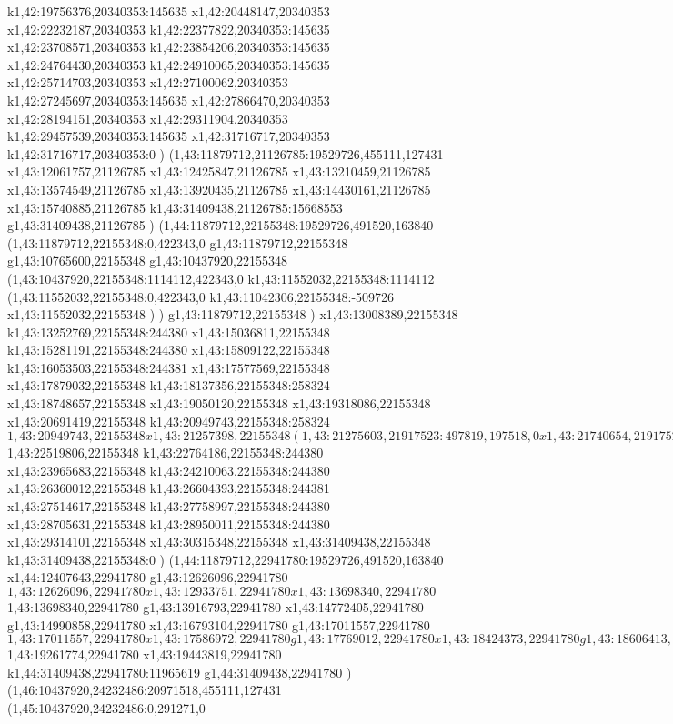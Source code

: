 {k1,42:19756376,20340353:145635
x1,42:20448147,20340353
x1,42:22232187,20340353
k1,42:22377822,20340353:145635
x1,42:23708571,20340353
k1,42:23854206,20340353:145635
x1,42:24764430,20340353
k1,42:24910065,20340353:145635
x1,42:25714703,20340353
x1,42:27100062,20340353
k1,42:27245697,20340353:145635
x1,42:27866470,20340353
x1,42:28194151,20340353
x1,42:29311904,20340353
k1,42:29457539,20340353:145635
x1,42:31716717,20340353
k1,42:31716717,20340353:0
)
(1,43:11879712,21126785:19529726,455111,127431
x1,43:12061757,21126785
x1,43:12425847,21126785
x1,43:13210459,21126785
x1,43:13574549,21126785
x1,43:13920435,21126785
x1,43:14430161,21126785
x1,43:15740885,21126785
k1,43:31409438,21126785:15668553
g1,43:31409438,21126785
)
(1,44:11879712,22155348:19529726,491520,163840
(1,43:11879712,22155348:0,422343,0
g1,43:11879712,22155348
g1,43:10765600,22155348
g1,43:10437920,22155348
(1,43:10437920,22155348:1114112,422343,0
k1,43:11552032,22155348:1114112
(1,43:11552032,22155348:0,422343,0
k1,43:11042306,22155348:-509726
x1,43:11552032,22155348
)
)
g1,43:11879712,22155348
)
x1,43:13008389,22155348
k1,43:13252769,22155348:244380
x1,43:15036811,22155348
k1,43:15281191,22155348:244380
x1,43:15809122,22155348
k1,43:16053503,22155348:244381
x1,43:17577569,22155348
x1,43:17879032,22155348
k1,43:18137356,22155348:258324
x1,43:18748657,22155348
x1,43:19050120,22155348
x1,43:19318086,22155348
x1,43:20691419,22155348
k1,43:20949743,22155348:258324
$1,43:20949743,22155348
x1,43:21257398,22155348
(1,43:21275603,21917523:497819,197518,0
x1,43:21740654,21917523
)
x1,43:22519806,22155348
$1,43:22519806,22155348
k1,43:22764186,22155348:244380
x1,43:23965683,22155348
k1,43:24210063,22155348:244380
x1,43:26360012,22155348
k1,43:26604393,22155348:244381
x1,43:27514617,22155348
k1,43:27758997,22155348:244380
x1,43:28705631,22155348
k1,43:28950011,22155348:244380
x1,43:29314101,22155348
x1,43:30315348,22155348
x1,43:31409438,22155348
k1,43:31409438,22155348:0
)
(1,44:11879712,22941780:19529726,491520,163840
x1,44:12407643,22941780
g1,43:12626096,22941780
$1,43:12626096,22941780
x1,43:12933751,22941780
x1,43:13698340,22941780
$1,43:13698340,22941780
g1,43:13916793,22941780
x1,43:14772405,22941780
g1,43:14990858,22941780
x1,43:16793104,22941780
g1,43:17011557,22941780
$1,43:17011557,22941780
x1,43:17586972,22941780
g1,43:17769012,22941780
x1,43:18424373,22941780
g1,43:18606413,22941780
x1,43:19261774,22941780
$1,43:19261774,22941780
x1,43:19443819,22941780
k1,44:31409438,22941780:11965619
g1,44:31409438,22941780
)
(1,46:10437920,24232486:20971518,455111,127431
(1,45:10437920,24232486:0,291271,0
}
